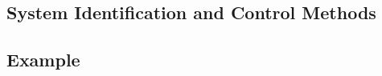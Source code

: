 %








\subsection{System Identification and Control Methods}
\label{subsec:sys_iden_and_control_methods}






\subsection{Example}%
\label{subsec:hgraph_example}


